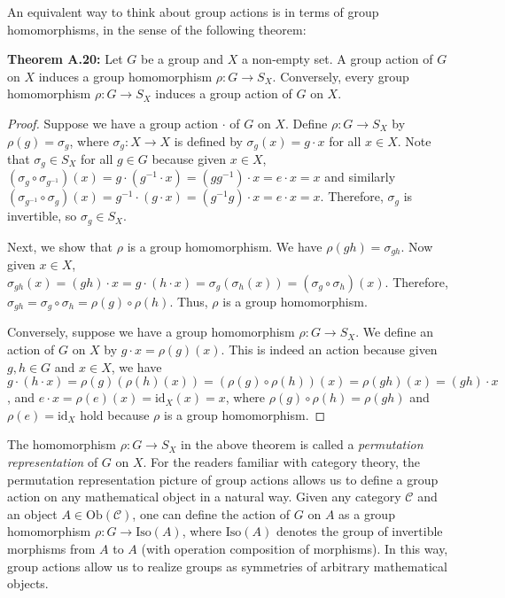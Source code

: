 \documentclass[12pt]{article}
\newcommand{\vs}{\vskip10pt}
\begin{document}
	An equivalent way to think about group actions is in terms of group homomorphisms, in the sense of the following theorem: 
	
	\vs 
	
	\textbf{Theorem A.20: } Let $G$ be a group and $X$ a non-empty set. A group action of $G$ on $X$ induces a group homomorphism $\rho: G \rightarrow S_X$. Conversely, every group homomorphism $\rho: G \rightarrow S_X$ induces a group action of $G$ on $X$. 
	
	\begin{proof}
		
		Suppose we have a group action $\cdot$ of $G$ on $X$. Define $\rho: G \rightarrow S_X$ by $\rho(g) = \sigma_g$, where $\sigma_g: X \rightarrow X$ is defined by $\sigma_g(x) = g \cdot x$ for all $x \in X$. Note that $\sigma_g \in S_X$ for all $g \in G$ because given $x \in X$, $(\sigma_g \circ \sigma_{g^{-1}}) (x) = g \cdot (g^{-1} \cdot x) = (gg^{-1}) \cdot x = e \cdot x = x$ and similarly $(\sigma_{g^{-1}} \circ \sigma_g) (x) = g^{-1} \cdot (g \cdot x) = (g^{-1} g) \cdot x = e \cdot x = x$. Therefore, $\sigma_g$ is invertible, so $\sigma_g \in S_X$. 
		
		\vskip5pt
		
		Next, we show that $\rho$ is a group homomorphism. We have $\rho(gh) = \sigma_{gh}$. Now given $x \in X$, $\sigma_{gh}(x) = (gh) \cdot x = g \cdot (h \cdot x) = \sigma_g(\sigma_h (x)) = (\sigma_g \circ \sigma_h) (x)$. Therefore, $\sigma_{gh} = \sigma_g \circ \sigma_h = \rho(g) \circ \rho(h)$. Thus, $\rho$ is a group homomorphism. 
		
		\vs 
		
		Conversely, suppose we have a group homomorphism $\rho: G \rightarrow S_X$. We define an action of $G$ on $X$ by $g \cdot x = \rho(g)(x)$. This is indeed an action because given $g,h \in G$ and $x \in X$, we have $g \cdot (h \cdot x) = \rho(g) (\rho(h) (x)) = (\rho(g) \circ \rho(h)) (x) = \rho(gh) (x) = (gh) \cdot x$, and $e \cdot x = \rho(e) (x) = \text{id}_X (x) = x$, where $\rho(g) \circ \rho(h) = \rho(gh)$ and $\rho(e) = \text{id}_X$ hold because $\rho$ is a group homomorphism. 
	\end{proof}
	
	\vs 
	
	The homomorphism $\rho: G \rightarrow S_X$ in the above theorem is called a \textit{permutation representation} of $G$ on $X$. For the readers familiar with category theory, the permutation representation picture of group actions allows us to define a group action on any mathematical object in a natural way. Given any category $\mathcal{C}$ and an object $A \in \text{Ob} (\mathcal{C})$, one can define the action of $G$ on $A$ as a group homomorphism $\rho: G \rightarrow \text{Iso}(A)$, where $\text{Iso}(A)$ denotes the group of invertible morphisms from $A$ to $A$ (with operation composition of morphisms). In this way, group actions allow us to realize groups as symmetries of arbitrary mathematical objects. 
	
\end{document}

